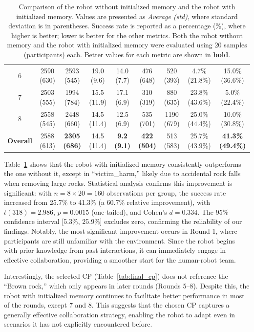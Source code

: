 \documentclass[letterpaper]{article} %
\begin{document}
\begin{table}[tb]
{\begin{tabular}{c|cc|cc|cc|cc}
    6  & 2590 (630) & 2593 (545)  & 19.0 (9.6)   & 14.0 (7.7)  & 476 (648)  & 520 (393)  & 4.7\% (21.8\%)   & 15.0\% (36.6\%)  \\
    7  & 2503 (555) & 1994 (784)  & 15.5 (11.9)  & 17.1 (6.9)  & 310 (319)  & 880 (635)  & 23.8\% (43.6\%)  & 5.0\% (22.4\%)   \\
    8  & 2558 (545) & 2448 (660)  & 14.5 (11.4)  & 12.5 (6.9)  & 535 (701)  & 1190 (679) & 25.0\% (44.4\%)  & 10.0\% (30.8\%)  \\
    \midrule
    \textbf{Overall} 
    & 2588 (613)  & \textbf{2305 (686)}  
    & 14.5 (11.4) & \textbf{9.2 (9.1)}  
    & \textbf{422 (504)}   & 513 (583)  
    & 25.7\% (43.9\%)  & \textbf{41.3\% (49.4\%)}  \\
    \bottomrule
    \end{tabular}
    }
    \caption{Comparison of the robot without initialized memory and the robot with initialized memory. 
    Values are presented as \textit{Average (std)}, where standard deviation is in parentheses. 
    Success rate is reported as a percentage (\%), where higher is better; lower is better for the other metrics. 
    Both the robot without memory and the robot with initialized memory were evaluated using 20 samples (participants) each. Better values for each metric are shown in \textbf{bold}.}
    \label{tab:comparison} 
\end{table}

Table~\ref{tab:comparison} shows that the robot with initialized memory consistently outperforms the one without it, except in ``victim\_harm,'' likely due to accidental rock falls when removing large rocks. Statistical analysis confirms this improvement is significant: with $n = 8 \times 20 = 160$ observations per group, the success rate increased from 25.7\% to 41.3\% (a 60.7\% relative improvement), with $t(318) = 2.986$, $p = 0.0015$ (one-tailed), and Cohen's $d = 0.334$. The 95\% confidence interval [5.3\%, 25.9\%] excludes zero, confirming the reliability of our findings. Notably, the most significant improvement occurs in Round 1, where participants are still unfamiliar with the environment. Since the robot begins with prior knowledge from past interactions, it can immediately engage in effective collaboration, providing a smoother start for the human-robot team.

Interestingly, the selected CP (Table~\ref{tab:final_cp}) does not reference the ``Brown rock,'' which only appears in later rounds (Rounds 5–8). Despite this, the robot with initialized memory continues to facilitate better performance in most of the rounds, except 7 and 8. This suggests that the chosen CP captures a generally effective collaboration strategy, enabling the robot to adapt even in scenarios it has not explicitly encountered before.
\end{document}
